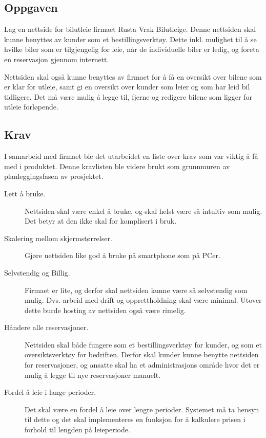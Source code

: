\subsection{Oppgaven}

Lag en nettside for bilutleie firmaet Rusta Vrak Bilutleige. Denne nettsiden skal kunne benyttes av kunder som et bestillingsverktøy. Dette inkl. mulighet til å se hvilke biler som er tilgjengelig for leie, når de individuelle biler er ledig, og foreta en reservasjon gjennom internett.


Nettsiden skal også kunne benyttes av firmaet for å få en oversikt over bilene som er klar for utleie, samt gi en oversikt over kunder som leier og som har leid bil tidligere. Det må være mulig å legge til, fjerne og redigere bilene som ligger for utleie forløpende.


\subsection{Krav} \label{kravliste1}
I samarbeid med firmaet ble det utarbeidet en liste over krav som var viktig å få med i produktet. Denne kravlisten ble videre brukt som grunnmuren av planleggingsfasen av prosjektet. 
\begin{description}
\item[Lett å bruke.]Nettsiden skal være enkel å bruke, og skal helst være så intuitiv som mulig. Det betyr at den ikke skal for komplisert i bruk.
\item[Skalering mellom skjermstørrelser.]Gjøre nettsiden like god å bruke på smartphone som på PCer.
\item[Selvstendig og Billig.]Firmaet er lite, og derfor skal nettsiden kunne være så selvstendig som mulig. Dvs. arbeid med drift og opprettholdning skal være minimal. Utover dette burde hosting av nettsiden også være rimelig.
\item[Håndere alle reservasjoner.]Nettsiden skal både fungere som et bestillingsverktøy for kunder, og som et oversiktsverktøy for bedriften. Derfor skal kunder kunne benytte nettsiden for reservasjoner, og ansatte skal ha et administrasjons område hvor det er mulig å legge til nye reservasjoner manuelt.
\item[Fordel å leie i lange perioder.]Det skal være en fordel å leie over lengre perioder. Systemet må ta hensyn til dette og det skal implementeres en funksjon for å kalkulere prisen i forhold til lengden på leieperiode.
\end{description}

